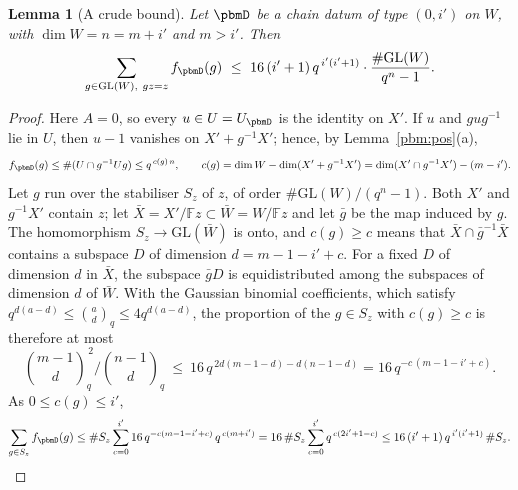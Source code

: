\documentclass[10pt]{amsart}
\newtheorem{lemma}[theorem]{Lemma}
\theoremstyle{definition}
\theoremstyle{remark}
\providecommand{\auF}{\mathbb F}
\providecommand{\auGL}{\mathrm{GL}}
\begin{document}
\begin{lemma}[A crude bound]\label{pbm:crude}
Let $\pbmD$ be a chain datum of type $(0,i')$ on $W$, with $\dim W=n=m+i'$ and $m>i'$. Then
\[
\sum_{g\in\auGL(W),\ gz=z}f_\pbmD(g)\ \le\ 16\,(i'+1)\,q^{\,i'(i'+1)}\cdot\frac{\#\auGL(W)}{q^n-1}.
\]
\end{lemma}
\begin{proof}
Here $A=0$, so every $u\in U=U_\pbmD$ is the identity on $X'$. If $u$ and $gug^{-1}$ lie in $U$,
then $u-1$ vanishes on $X'+g^{-1}X'$; hence, by Lemma~\ref{pbm:pos}(a),
\[
f_\pbmD(g)\le\#(U\cap g^{-1}Ug)\le q^{\,c(g)\,n},\qquad c(g)=\dim W-\dim(X'+g^{-1}X')=\dim(X'\cap g^{-1}
X')-(m-i').
\]
Let $g$ run over the stabiliser $S_z$ of $z$, of order $\#\auGL(W)/(q^n-1)$. Both $X'$ and
$g^{-1}X'$ contain $z$; let $\bar X=X'/\auF z\subset\bar W=W/\auF z$ and let $\bar g$ be the map
induced by $g$. The homomorphism $S_z\to\auGL(\bar W)$ is onto, and $c(g)\ge c$ means that
$\bar X\cap\bar g^{-1}\bar X$ contains a subspace $D$ of dimension $d=m-1-i'+c$. For a fixed $D$ of
dimension $d$ in $\bar X$, the subspace $\bar gD$ is equidistributed among the subspaces of
dimension $d$ of $\bar W$. With the Gaussian binomial coefficients, which satisfy $q^{d(a-d)}\le
\binom ad_q\le4q^{d(a-d)}$, the proportion of the $g\in S_z$ with $c(g)\ge c$ is therefore at most
\[
\binom{m-1}d_q^{\,2}\Big/\binom{n-1}d_q\ \le\ 16\,q^{\,2d(m-1-d)-d(n-1-d)}=16\,q^{-c\,(m-1-i'+c)} .
\]
As $0\le c(g)\le i'$,
\[
\sum_{g\in S_z}f_\pbmD(g)\le\#S_z\sum_{c=0}^{i'}16\,q^{-c(m-1-i'+c)}\,q^{\,c(m+i')}=16\,\#S_z\sum_{c=0}^{i'}
q^{\,c(2i'+1-c)}\le16\,(i'+1)\,q^{\,i'(i'+1)}\,\#S_z .\qedhere
\]
\end{proof}
\end{document}
